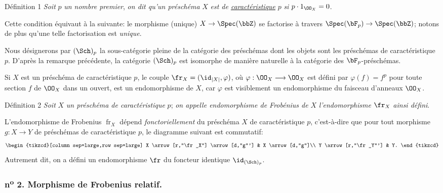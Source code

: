 \begin{statement}{Définition 1}
\emph{Soit} $p$ \emph{un nombre premier}, \emph{on dit qu'un préschéma} $X$ \emph{est de \underline{caractéristique}} $p$ \emph{si} $p\cdot 1_{\OO_X}=0$.
\end{statement}

Cette condition équivaut à la suivante: le morphisme (unique) $X\to\Spec(\bbZ)$ se factorise à travers $\Spec(\bF_p)\to\Spec(\bbZ)$; notons de plus qu'une telle factorisation est \emph{unique}.

Nous désignerons par $(\Sch)_p$ la sous-catégorie pleine de la catégorie des préschémas dont les objets sont les préschémas de caractéristique $p$. D'après la remarque précédente, la catégorie $(\Sch)_p$ est isomorphe de manière naturelle à la catégorie des $\bF_p$-préschémas.

Si $X$ est un préschéma de caractéristique $p$, le couple $\fr_X=(\id_{|X|},\varphi)$, où $\varphi:\OO_X\longrightarrow\OO_X$ est défini par $\varphi(f)=f^p$ pour toute section $f$ de $\OO_X$ dans un ouvert, est un endomorphisme de $X$, car $\varphi$ est visiblement un endomorphisme du faisceau d'anneaux $\OO_X$.

\begin{statement}{Définition 2}
\emph{Soit} $X$ \emph{un préschéma de caractéristique} $p$; \emph{on appelle endomorphisme de Frobénius de} $X$ \emph{l'endomorphisme} $\fr_X$ \emph{ainsi défini}.
\end{statement}

L'endomorphisme de Frobenius $\operatorname{fr}_X$ dépend \emph{fonctoriellement} du préschéma $X$ de caractéristique $p$, c'est-à-dire que pour tout morphisme $g:X\to Y$ de préschémas de caractéristique $p$, le diagramme suivant est commutatif:
\[
\begin{tikzcd}[column sep=large,row sep=large]
X \arrow[r,"\fr_X"] \arrow[d,"g"'] & X \arrow[d,"g"]\\
Y \arrow[r,"\fr_Y"'] & Y.
\end{tikzcd}
\]
Autrement dit, on a défini un endomorphisme $\fr$ du foncteur identique $\id_{(\Sch)_p}$.

\subsubsection*{n\textsuperscript{o} 2. Morphisme de Frobenius relatif.}

